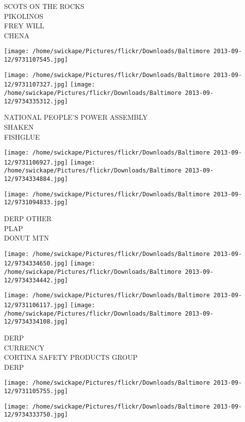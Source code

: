 \documentclass[10pt,letterpaper]{article}
\begin{document}
SCOTS ON THE ROCKS\\
PIKOLINOS\\
FREY WILL\\
CHENA
\pagebreak

\texttt{[image: /home/swickape/Pictures/flickr/Downloads/Baltimore 2013-09-12/9731107545.jpg]}

\vspace{0.25in}
\texttt{[image: /home/swickape/Pictures/flickr/Downloads/Baltimore 2013-09-12/9731107327.jpg]}
\texttt{[image: /home/swickape/Pictures/flickr/Downloads/Baltimore 2013-09-12/9734335312.jpg]}

NATIONAL PEOPLE'S POWER ASSEMBLY\\
SHAKEN\\
FISHGLUE
\pagebreak

\texttt{[image: /home/swickape/Pictures/flickr/Downloads/Baltimore 2013-09-12/9731106927.jpg]}
\texttt{[image: /home/swickape/Pictures/flickr/Downloads/Baltimore 2013-09-12/9734334884.jpg]}

\vspace{0.25in}
\texttt{[image: /home/swickape/Pictures/flickr/Downloads/Baltimore 2013-09-12/9731094833.jpg]}

DERP OTHER\\
PLAP\\
DONUT MTN
\pagebreak

\texttt{[image: /home/swickape/Pictures/flickr/Downloads/Baltimore 2013-09-12/9734334650.jpg]}
\texttt{[image: /home/swickape/Pictures/flickr/Downloads/Baltimore 2013-09-12/9734334442.jpg]}

\texttt{[image: /home/swickape/Pictures/flickr/Downloads/Baltimore 2013-09-12/9731106117.jpg]}
\texttt{[image: /home/swickape/Pictures/flickr/Downloads/Baltimore 2013-09-12/9734334108.jpg]}

DERP\\
CURRENCY\\
CORTINA SAFETY PRODUCTS GROUP\\
DERP
\pagebreak

\texttt{[image: /home/swickape/Pictures/flickr/Downloads/Baltimore 2013-09-12/9731105755.jpg]}

\vspace{0.25in}
\texttt{[image: /home/swickape/Pictures/flickr/Downloads/Baltimore 2013-09-12/9734333750.jpg]}
\end{document}
